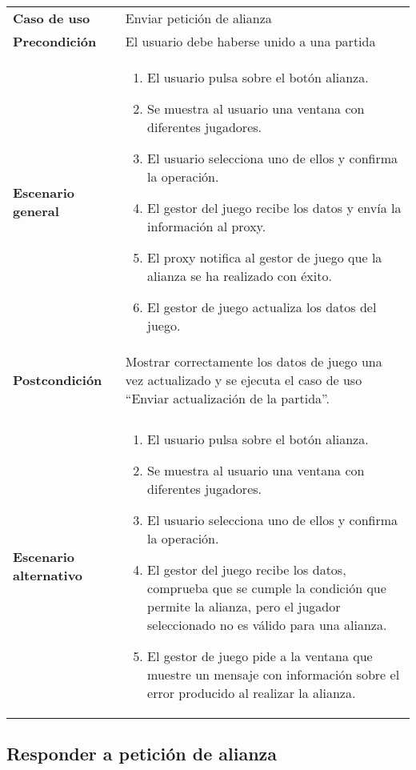 {\footnotesize
\begin{tabularx}{0.95\textwidth}{p{}|X}

\textbf{Caso de uso} & Enviar petición de alianza \\

\textbf{Precondición} & El usuario debe haberse unido a una partida \\

\textbf{Escenario general} & \begin{enumerate}
\item El usuario pulsa sobre el botón alianza.
\item Se muestra al usuario una ventana con diferentes jugadores.
\item El usuario selecciona uno de ellos y confirma la operación.
\item El gestor del juego recibe los datos y envía la información al proxy.
\item El proxy notifica al gestor de juego que la alianza se ha realizado con
éxito.
\item El gestor de juego actualiza los datos del juego.
\end{enumerate} \\
\textbf{Postcondición} & Mostrar correctamente los datos de juego una vez
actualizado y se ejecuta el caso de uso  ``Enviar actualización de
la partida''. \\ \\
\textbf{Escenario alternativo} & \begin{enumerate}
\item El usuario pulsa sobre el botón alianza.
\item Se muestra al usuario una ventana con diferentes jugadores.
\item El usuario selecciona uno de ellos y confirma la operación.
\item El gestor del juego recibe los datos, comprueba que se cumple la condición
que permite la alianza, pero el jugador seleccionado no es válido para una
alianza.
\item El gestor de juego pide a la ventana que muestre un mensaje con
información sobre el error producido al realizar la alianza.
\end{enumerate}\\
\end{tabularx}
}

\subsection{Responder a petición de alianza}


